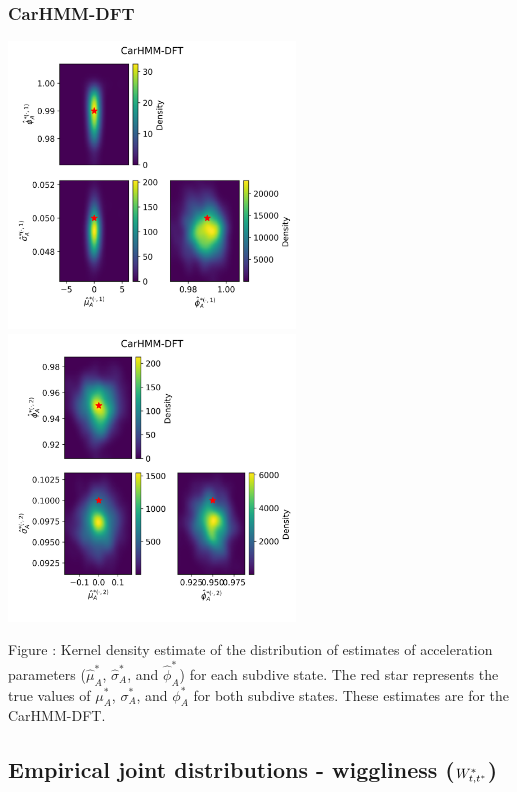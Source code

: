 \documentclass{article}
\begin{document}
        \subsubsection{CarHMM-DFT}
        \begin{center}
        \includegraphics[width=3in]{../Plots/hmm_FV_MLE_density_A_0_0.png}
        \includegraphics[width=3in]{../Plots/hmm_FV_MLE_density_A_0_1.png}
        \end{center}
        
        \noindent Figure : Kernel density estimate of the distribution of estimates of acceleration parameters ($\hat \mu^*_A$, $\hat \sigma^*_A$, and $\hat \phi^*_A$) for each subdive state. The red star represents the true values of $\mu^*_A$, $\sigma^*_A$, and $\phi^*_A$ for both subdive states. These estimates are for the CarHMM-DFT.
        \addtocounter{fignum}{1}
        
    \newpage
    \subsection{Empirical joint distributions - wiggliness ($W^*_{t,t^*}$)}
    
\end{document}
